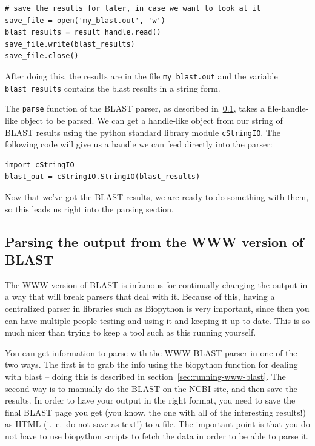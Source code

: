 \documentclass{report}
\begin{document}
\begin{verbatim}
# save the results for later, in case we want to look at it
save_file = open('my_blast.out', 'w')
blast_results = result_handle.read()
save_file.write(blast_results)
save_file.close()
\end{verbatim}

After doing this, the results are in the file \verb|my_blast.out| and the
variable \verb|blast_results| contains the blast results in a string
form.


The \verb|parse| function of the BLAST parser, as described
in~\ref{sec:parsing-www-blast}, takes a file-handle-like object to be
parsed. We can get a handle-like object from our string of BLAST
results using the python standard library module \verb|cStringIO|. The 
following code will give us a handle we can feed directly into the
parser:

\begin{verbatim}
import cStringIO
blast_out = cStringIO.StringIO(blast_results)
\end{verbatim}


Now that we've got the BLAST results, we are ready to do
something with them, so this leads us right into the parsing section.

\subsection{Parsing the output from the WWW version of BLAST}
\label{sec:parsing-www-blast}

The WWW version of BLAST is infamous for continually
changing the output in a way that will break parsers that deal with
it. Because of this, having a centralized parser in libraries such as
Biopython is very important, since then you can have multiple people
testing and using it and keeping it up to date. This is so much nicer
than trying to keep a tool such as this running yourself.


You can get information to parse with the WWW BLAST parser in one of
the two ways. The first is to grab the info using the biopython
function for dealing with blast -- doing this is described in
section~\ref{sec:running-www-blast}. The 
second way is to manually do the BLAST on the NCBI site, and then save
the results. In order to have your output in the right format, you
need to save the final BLAST page you get (you know, the one with all
of the interesting results!) as HTML (i.~e.~do not save as text!) to a
file. The important point is that you do not have to use biopython
scripts to fetch the data in order to be able to parse it.
\end{document}
